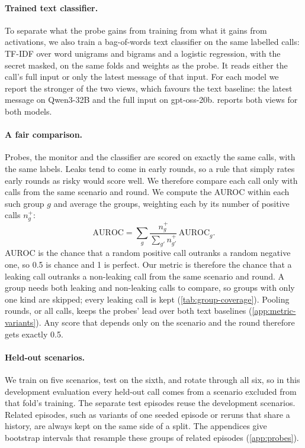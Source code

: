 \paragraph{Trained text classifier.}
To separate what the probe gains from training from what it gains from activations, we also train a bag-of-words text classifier on the same labelled calls: TF-IDF over word unigrams and bigrams and a logistic regression, with the secret masked, on the same folds and weights as the probe.
It reads either the call's full input or only the latest message of that input.
For each model we report the stronger of the two views, which favours the text baseline: the latest message on Qwen3-32B and the full input on gpt-oss-20b.
 reports both views for both models.

\paragraph{A fair comparison.}
Probes, the monitor and the classifier are scored on exactly the same calls, with the same labels.
Leaks tend to come in early rounds, so a rule that simply rates early rounds as risky would score well.
We therefore compare each call only with calls from the same scenario and round.
We compute the AUROC within each such group $g$ and average the groups, weighting each by its number of positive calls $n^+_g$:
\begin{equation*}
  \mathrm{AUROC} = \sum_g \frac{n^+_g}{\sum_{g'} n^+_{g'}}\, \mathrm{AUROC}_g .
\end{equation*}
AUROC is the chance that a random positive call outranks a random negative one, so 0.5 is chance and 1 is perfect.
Our metric is therefore the chance that a leaking call outranks a non-leaking call from the same scenario and round.
A group needs both leaking and non-leaking calls to compare, so groups with only one kind are skipped; every leaking call is kept (\cref{tab:group-coverage}).
Pooling rounds, or all calls, keeps the probes' lead over both text baselines (\cref{app:metric-variants}).
Any score that depends only on the scenario and the round therefore gets exactly 0.5.

\paragraph{Held-out scenarios.}
We train on five scenarios, test on the sixth, and rotate through all six, so in this development evaluation every held-out call comes from a scenario excluded from that fold's training. The separate test episodes reuse the development scenarios.
Related episodes, such as variants of one seeded episode or reruns that share a history, are always kept on the same side of a split.
The appendices give bootstrap intervals that resample these groups of related episodes (\cref{app:probes}).

